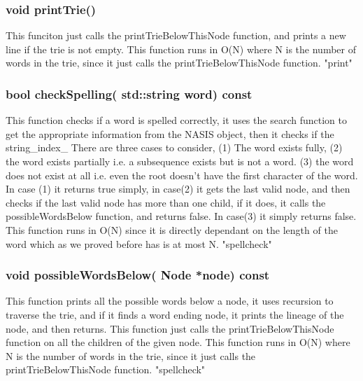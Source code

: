 \documentclass[a4paper]{article}
\begin{document}
\subsubsection{{\color{orange}void} {\color{draculapurple}printTrie}()} 
This funciton just calls the {\color{draculapurple}printTrieBelowThisNode} function, and prints a new line if the trie is not empty. This function runs in {\color{lightblue}O(N)} where {\color{lightblue}N} is the number of words in the trie, since it just calls the {\color{draculapurple}printTrieBelowThisNode} function.
{\color{GoldenYellow}"print"}

\subsubsection{{\color{orange}bool} {\color{draculapurple}checkSpelling}({\color{orange} std::string} word) {\color{GoldenYellow} const}}
This function checks if a word is spelled correctly, it uses the {\color{draculapurple}search} function to get the appropriate information from the NASIS object, then it checks if the {\color{draculapurple}string\_index\_}
There are three cases to consider, (1) The word exists fully, (2) the word exists partially i.e. a subsequence exists but is not a word. (3) the word does not exist at all i.e. even the root doesn't have the first character of the word.
In case (1) it returns true simply, in case(2) it gets the last valid node, and then checks if the last valid node has more than one child, if it does, it calls the {\color{draculapurple}possibleWordsBelow} function, and returns false. In case(3) it simply returns false.
This function runs in {\color{lightblue}O(N)} since it is directly dependant on the length of the word which as we proved before has is at most {\color{lightblue}N}.
{\color{GoldenYellow}"spellcheck"}

\subsubsection{{\color{orange}void} {\color{draculapurple}possibleWordsBelow}({\color{orange} Node} *node) {\color{GoldenYellow} const}}
This function prints all the possible words below a node, it uses recursion to traverse the trie, and if it finds a word ending node, it prints the lineage of the node, and then returns. 
This function just calls the {\color{draculapurple}printTrieBelowThisNode} function on all the children of the given node. This function runs in {\color{lightblue}O(N)} where {\color{lightblue}N} is the number of words in the trie, since it just calls the {\color{draculapurple}printTrieBelowThisNode} function.
{\color{GoldenYellow}"spellcheck"}
\end{document}
